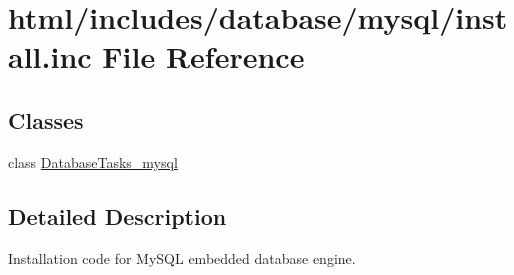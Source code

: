 \hypertarget{database_2mysql_2install_8inc}{
\section{html/includes/database/mysql/install.inc File Reference}
\label{database_2mysql_2install_8inc}
}
\subsection*{Classes}
\begin{DoxyCompactItemize}
\item 
class \hyperlink{classDatabaseTasks__mysql}{DatabaseTasks\_\-mysql}
\end{DoxyCompactItemize}


\subsection{Detailed Description}
Installation code for MySQL embedded database engine. 